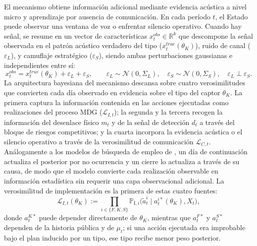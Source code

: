 \documentclass[review,authoryear,12pt]{elsarticle}
\theoremstyle{plain}
\theoremstyle{definition}
\newcommand{\1}{\mathbf{1}}
\newcommand{\ProbI}[1]{\mathbb{P}_{\mathrm{I},#1}}
\begin{document}
El mecanismo obtiene información adicional mediante evidencia acústica a nivel micro y aprendizaje por ausencia de comunicación. En cada período $t$, el Estado puede observar una ventana de voz o enfrentar silencio operativo. Cuando hay señal, se resume en un vector de características $x_t^{obs}\in\mathbb{R}^k$ que descompone la señal observada en el patrón acústico verdadero del tipo ($x_t^{true}(\theta_K)$), ruido de canal ($\varepsilon_L$), y camuflaje estratégico ($\varepsilon_S$), siendo ambas perturbaciones gaussianas e independientes entre sí:
\begin{equation}
x_t^{obs}=x_t^{true}(\theta_K)+\varepsilon_L+\varepsilon_S,\qquad\varepsilon_L\sim\mathcal{N}(0,\Sigma_L),\quad\varepsilon_S\sim\mathcal{N}(0,\Sigma_S),\quad\varepsilon_L\perp\varepsilon_S.
\label{eq:voz-descomp}
\end{equation}
La arquitectura bayesiana del mecanismo descansa sobre cuatro verosimilitudes que convierten cada día observado en evidencia sobre el tipo del captor $\theta_K$. La primera captura la información contenida en las acciones ejecutadas como realizaciones del proceso MDG ($\mathcal{L}_{I,t}$); la segunda y la tercera recogen la información del desenlace físico $m_t$ y de la señal de detección $d_t$ a través del bloque de riesgos competitivos; y la cuarta incorpora la evidencia acústica o el silencio operativo a través de la verosimilitud de comunicación $\mathcal{L}_{C,t}$. Análogamente a los modelos de búsqueda de empleo de \citet{McCall1970}, un día de continuación actualiza el posterior por no ocurrencia y un cierre lo actualiza a través de su causa, de modo que el modelo convierte cada realización observable en información estadística sin requerir una capa observacional adicional. La verosimilitud de implementación es la primera de estas cuatro fuentes:
\begin{equation}
\mathcal{L}_{I,t}(\theta_K):=\prod_{i\in\{F,K,S\}}\ProbI{i}\!\bigl(\tilde{a}_t^i\mid a_t^{i\ast}(\theta_K),X_t\bigr),
\label{eq:LI-atilde}
\end{equation}
donde $a_t^{K\ast}$ puede depender directamente de $\theta_K$, mientras que $a_t^{F\ast}$ y $a_t^{S\ast}$ dependen de la historia pública y de $\mu_t$; si una acción ejecutada era improbable bajo el plan inducido por un tipo, ese tipo recibe menor peso posterior.
\end{document}
